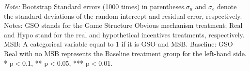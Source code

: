 \documentclass[12pt]{article}
\begin{document}
\begin{table}[H]
\begin{tablenotes}
            \footnotesize
            \item \textit{Note:} Bootstrap Standard errors (1000 times) in parentheses.$\sigma_u$ and $\sigma_e$ denote the standard deviations of the random intercept and residual error, respectively. Notes: GSO stands for the Game Structure Obvious mechanism treatment; Real and Hypo stand for the real and hypothetical incentives treatments, respectively. MSB: A categorical variable equal to 1 if it is GSO and MSB. Baseline: GSO Real with no MSB represents the Baseline treatment group for the left-hand side. * p$<$0.1, ** p$<$0.05, *** p$<$0.01.
        \end{tablenotes}
\end{table}





\clearpage
\end{document}
